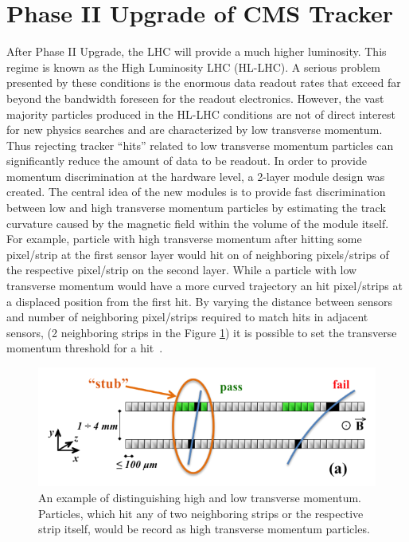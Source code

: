 \section{Phase II Upgrade of CMS Tracker}


After Phase II Upgrade, the LHC will provide a much higher luminosity. This regime is known as the High Luminosity LHC (HL-LHC). A serious problem presented by these conditions is the enormous data readout rates that exceed far beyond the bandwidth foreseen for the readout electronics.
However, the vast majority particles produced in the HL-LHC conditions are not of direct interest for new physics searches and are characterized by low transverse momentum. Thus rejecting tracker “hits” related to low transverse momentum particles can significantly reduce the amount of data to be readout. In order to provide momentum discrimination at the hardware level, a 2-layer module design was created. The central idea of the new modules is to provide fast discrimination between low and high transverse momentum particles by estimating the track curvature caused by the magnetic field within the volume of the module itself. For example, particle with high transverse momentum after hitting some pixel/strip at the first sensor layer would hit on of neighboring pixels/strips of the respective pixel/strip on the second layer. While a particle with low transverse momentum would have a more curved trajectory an hit pixel/strips at a displaced position from the first hit. By varying the distance between sensors and number of neighboring pixel/strips required to match hits in adjacent sensors, (2 neighboring strips in the Figure \ref{fig:low_high_pT}) it is possible to set the transverse momentum threshold for a hit~\cite{CMS_TECH_PHASE_II}.


\begin{figure}[ht]\centering
\includegraphics[width=0.8\linewidth]{Data/Introduction/Low_high_pT.png}
\caption{An example of distinguishing high and low transverse momentum. Particles, which hit any of two neighboring strips or the respective strip itself, would be record as high transverse momentum particles.}
\label{fig:low_high_pT}
\end{figure}


